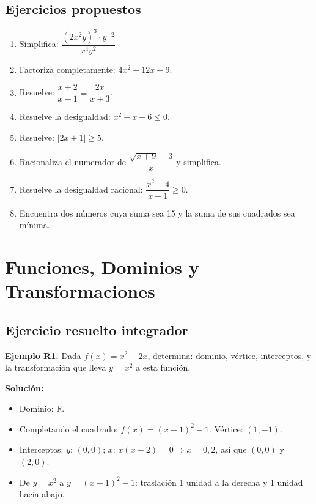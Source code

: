 \documentclass[12pt, letterpaper]{article}
\begin{document}
\subsection{Ejercicios propuestos}

\begin{enumerate}[series=ejercicios, leftmargin=*]
  \item \facil{} Simplifica: $\dfrac{(2x^2y)^3 \cdot y^{-2}}{x^{4} y^{2}}$

  \item \facil{} Factoriza completamente: $4x^2 - 12x + 9$.

  \item \facil{} Resuelve: $\dfrac{x + 2}{x - 1} = \dfrac{2x}{x + 3}$.

  \item \medio{} Resuelve la desigualdad: $x^2 - x - 6 \leq 0$.

  \item \medio{} Resuelve: $|2x + 1| \geq 5$.

  \item \dificil{} Racionaliza el numerador de $\dfrac{\sqrt{x + 9} - 3}{x}$ y simplifica.

  \item \dificil{} Resuelve la desigualdad racional: $\dfrac{x^2 - 4}{x - 1} \geq 0$.

  \item \dificil{} Encuentra dos números cuya suma sea 15 y la suma de sus cuadrados sea mínima.
\end{enumerate}

\vspace{4pt}

\section{Funciones, Dominios y Transformaciones}

\subsection{Ejercicio resuelto integrador}

\textbf{Ejemplo R1.} Dada $f(x) = x^2 - 2x$, determina: dominio, vértice, interceptos, y la transformación que lleva $y = x^2$ a esta función.

\begin{cuadrosolucion}
  \textbf{Solución:}
  \begin{itemize}
    \item Dominio: $\mathbb{R}$.
    \item Completando el cuadrado: $f(x) = (x - 1)^2 - 1$. Vértice: $(1, -1)$.
    \item Interceptos: $y$: $(0, 0)$; $x$: $x(x - 2) = 0 \Rightarrow x = 0, 2$, así que $(0, 0)$ y $(2, 0)$.
    \item De $y = x^2$ a $y = (x - 1)^2 - 1$: traslación 1 unidad a la derecha y 1 unidad hacia abajo.
  \end{itemize}
\end{cuadrosolucion}
\end{document}
